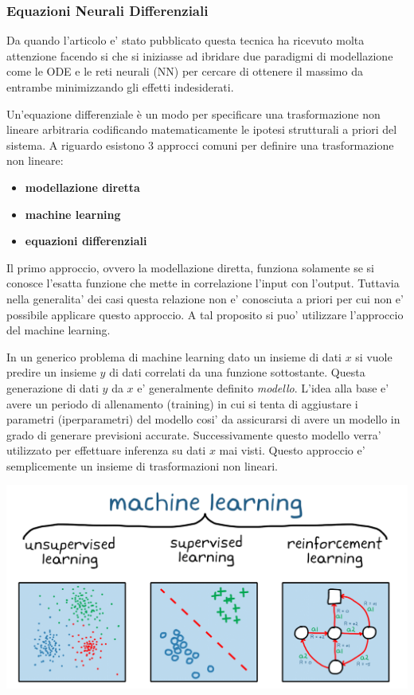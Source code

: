 \subsubsection*{Equazioni Neurali Differenziali}
Da quando l'articolo \cite{chen2019neural} e' stato pubblicato questa tecnica
ha ricevuto molta attenzione facendo si che si iniziasse ad ibridare due paradigmi di modellazione come
le ODE e le reti neurali (NN)  per cercare di ottenere il massimo da entrambe minimizzando 
gli effetti indesiderati. \cite{Kim_2021} \cite{chen2019neural}

Un'equazione differenziale è un modo per specificare una trasformazione 
non lineare arbitraria codificando matematicamente le ipotesi strutturali 
a priori del sistema. A riguardo esistono 3 approcci comuni per definire una 
trasformazione non lineare:

\begin{itemize}
    \item \textbf{modellazione diretta}
    \item \textbf{machine learning}
    \item \textbf{equazioni differenziali}
\end{itemize}

Il primo approccio, ovvero la modellazione diretta, funziona solamente se si 
conosce l'esatta funzione che mette in correlazione l'input con l'output. 
Tuttavia nella generalita' dei casi questa relazione non e' conosciuta a 
priori per cui non e' possibile applicare questo approccio. A tal proposito
si puo' utilizzare l'approccio del machine learning. 

In un generico problema di machine learning dato un insieme di dati $x$ si 
vuole predire un insieme $y$ di dati correlati da una funzione sottostante.
Questa generazione di dati $y$ da $x$ e' generalmente definito \emph{modello}. 
L'idea alla base e' avere un periodo di allenamento (training) in cui si tenta 
di aggiustare i parametri (iperparametri) del modello cosi' da assicurarsi di 
avere un modello in grado di generare previsioni accurate. Successivamente 
questo modello verra' utilizzato per effettuare inferenza su dati $x$ mai visti. 
Questo approccio e' semplicemente un insieme di trasformazioni non lineari. 

\begin{minipage}{\linewidth}
    \centering
    \includegraphics[width=\textwidth]{img/1689243301131.png}
    \label{fig:ML_example}
\end{minipage}

